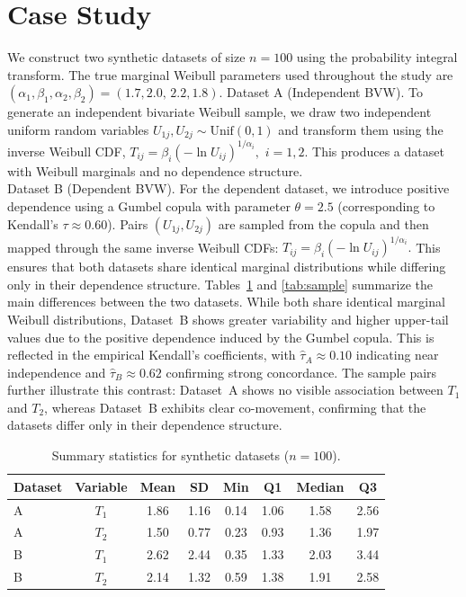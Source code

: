 \documentclass[twoside]{article}
\theoremstyle{plain}
\theoremstyle{definition}
\begin{document}
\section{Case Study}\label{sec:casestudy}

We construct two synthetic datasets of size $n=100$ using the probability integral transform. 
The true marginal Weibull parameters used throughout the study are
$  
(\alpha_1,\beta_1,\alpha_2,\beta_2)=(1.7,2.0,\,2.2,1.8).
$ 
Dataset A (Independent BVW).
To generate an independent bivariate Weibull sample, we draw two independent uniform random variables 
$U_{1j},U_{2j}\sim\mathrm{Unif}(0,1)$ and transform them using the inverse Weibull CDF,
$  
T_{ij}=\beta_i(-\ln U_{ij})^{1/\alpha_i}, \,\,i=1,2.
$  
This produces a dataset with Weibull marginals and no dependence structure.\\
Dataset B (Dependent BVW).
For the dependent dataset, we introduce positive dependence using a Gumbel copula with parameter 
$\theta=2.5$ (corresponding to Kendall’s $\tau\approx 0.60$). 
Pairs $(U_{1j},U_{2j})$ are sampled from the copula and then mapped through the same inverse Weibull CDFs:
$  
T_{ij}=\beta_i(-\ln U_{ij})^{1/\alpha_i}.
$  
This ensures that both datasets share identical marginal distributions while differing only in their dependence structure.
Tables~\ref{tab:desc} and \ref{tab:sample} summarize the main differences between the two datasets. While both share identical marginal Weibull distributions, Dataset~B shows greater variability and higher upper-tail values due to the positive dependence induced by the Gumbel copula. This is reflected in the empirical Kendall’s coefficients, with $\hat{\tau}_A\approx 0.10$ indicating near independence and $\hat{\tau}_B\approx 0.62$ confirming strong concordance. The sample pairs further illustrate this contrast: Dataset~A shows no visible association between $T_1$ and $T_2$, whereas Dataset~B exhibits clear co-movement, confirming that the datasets differ only in their dependence structure.

\begin{table}[h!]
\centering
\caption{Summary statistics for synthetic datasets ($n=100$).}
\begin{tabular}{@{}lccccccc@{}}
\toprule
Dataset & Variable & Mean & SD & Min & Q1 & Median & Q3 \\ \hline
\midrule
A
& $T_1$ & 1.86 & 1.16 & 0.14 & 1.06 & 1.58 & 2.56 \\ \hline
A& $T_2$ & 1.50 & 0.77 & 0.23 & 0.93 & 1.36 & 1.97 \\  \hline
\midrule
B
& $T_1$ & 2.62 & 2.44 & 0.35 & 1.33 & 2.03 & 3.44 \\ \hline
B& $T_2$ & 2.14 & 1.32 & 0.59 & 1.38 & 1.91 & 2.58 \\  \hline
\bottomrule
\end{tabular}
\label{tab:desc}
\end{table}
\end{document}
